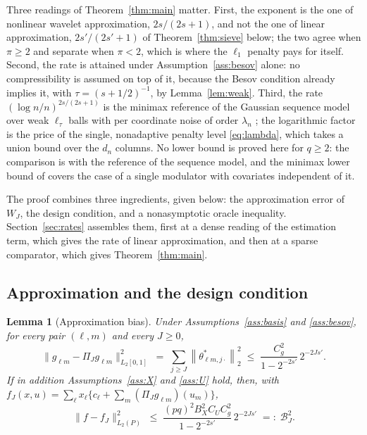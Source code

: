 \documentclass[12pt]{article} %
\newtheorem{lemma}{Lemma}
\theoremstyle{definition}
\newcommand{\norm}[1]{\left\lVert #1 \right\rVert}
\newcommand{\cv}{\ell}
\newcommand{\md}{m}
\newcommand{\lev}{j}
\newcommand{\lvl}[1]{c_{#1}}
\newcommand{\gcomp}[2]{g_{#1#2}}
\newcommand{\WJ}{W_{J}}
\newcommand{\PiJ}{\Pi_{J}}
\newcommand{\penn}{\lambda_{n}}
\newcommand{\seff}{s'}
\begin{document}
Three readings of Theorem~\ref{thm:main} matter. First, the exponent is the
one of nonlinear wavelet approximation, $2s/(2s+1)$, and not the one of
\textcolor{colR1}{linear approximation}, $2\seff/(2\seff+1)$ of Theorem~\ref{thm:sieve} below; the two
agree when $\pi \ge 2$ and separate when $\pi < 2$, which is where the
$\ell_1$ penalty pays for itself. Second, the rate is attained under
Assumption~\ref{ass:besov} alone: no compressibility is assumed on top of it,
because the Besov condition already implies it, with
$\tau = (s+1/2)^{-1}$, by Lemma~\ref{lem:weak}. Third, the rate
$(\log n/n)^{2s/(2s+1)}$ is the minimax reference of the Gaussian sequence
model over weak $\ell_\tau$ balls with per coordinate noise of order $\penn$
\citetext{\citealp{Donoho-Johnstone-1998}\textcolor{colR1}{; \citealp{johnstone2019gaussian}}}; the logarithmic factor is the price of the
single, nonadaptive penalty level \eqref{eq:lambda}, which takes a union bound
over the $d_n$ columns. No lower bound is proved here for $q \ge 2$: the
comparison is with the reference of the sequence model, and the minimax lower
bound of \citet{Klopp-Pensky-2015} covers the case of a single modulator with
covariates independent of it.

The proof combines three ingredients, given below: the approximation error of
\textcolor{colR1}{$\WJ$}, the design condition, and a nonasymptotic oracle inequality.
Section~\ref{sec:rates} assembles them, first at a dense reading of the
estimation term, which gives the \textcolor{colR1}{rate of linear approximation}, and then at a sparse comparator,
which gives Theorem~\ref{thm:main}.

\subsection{Approximation and the design condition}
\label{sec:approx}

\begin{lemma}[\textcolor{colR1}{Approximation bias}]
\label{lem:bias}
Under Assumptions~\ref{ass:basis} and \ref{ass:besov}, for every pair
$(\cv,\md)$ and every $J \ge 0$,
\[
  \bigl\lVert \gcomp{\cv}{\md} - \PiJ\gcomp{\cv}{\md}
  \bigr\rVert_{L_2[0,1]}^{2}
  \;=\; \sum_{\lev \ge J}\norm{\theta^{*}_{\cv\md,\lev\cdot}}_{2}^{2}
  \;\le\; \frac{C_g^{2}}{1-2^{-2\seff}}\,2^{-2J\seff} .
\]
If in addition Assumptions~\ref{ass:X} and \ref{ass:U} hold, then, with
$f_J(x,u) = \sum_{\cv}x_{\cv}\{\lvl{\cv} +
\sum_{\md}(\PiJ\gcomp{\cv}{\md})(u_{\md})\}$,
\begin{equation}
  \label{eq:bias}
  \bigl\lVert f - f_J\bigr\rVert_{L_2(P)}^{2} \;\le\;
  \frac{(pq)^{2}B_X^{2}C_UC_g^{2}}{1-2^{-2\seff}}\,2^{-2J\seff}
  \;=:\; \mathcal{B}_{J}^{2} .
\end{equation}
\end{lemma}
\end{document}
